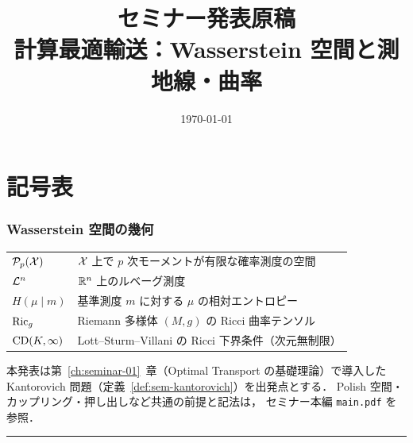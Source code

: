 \documentclass[uplatex, dvipdfmx]{jsreport}
\title{セミナー発表原稿\\{\Large 計算最適輸送：Wasserstein 空間と測地線・曲率}}
\author{}
\date{\today}
\begin{document}
\maketitle
\tableofcontents

\chapter*{記号表}

\subsection*{Wasserstein 空間の幾何}
\begin{tabular}{ll}
  $\mathcal{P}_p(\mathcal{X})$ & $\mathcal{X}$ 上で $p$ 次モーメントが有限な確率測度の空間 \\
  $\mathcal{L}^n$ & $\mathbb{R}^n$ 上のルベーグ測度 \\
  $H(\mu \mid m)$ & 基準測度 $m$ に対する $\mu$ の相対エントロピー \\
  $\operatorname{Ric}_g$ & Riemann 多様体 $(M, g)$ の Ricci 曲率テンソル \\
  $\mathrm{CD}(K, \infty)$ & Lott--Sturm--Villani の Ricci 下界条件（次元無制限） \\
\end{tabular}

\vspace{1em}\noindent
本発表は第~\ref{ch:seminar-01}~章（Optimal Transport の基礎理論）で導入した
Kantorovich 問題（定義~\ref{def:sem-kantorovich}）を出発点とする．
Polish 空間・カップリング・押し出しなど共通の前提と記法は，
セミナー本編 \texttt{main.pdf} を参照．

\vspace{0.5em}
\hrule


\end{document}
